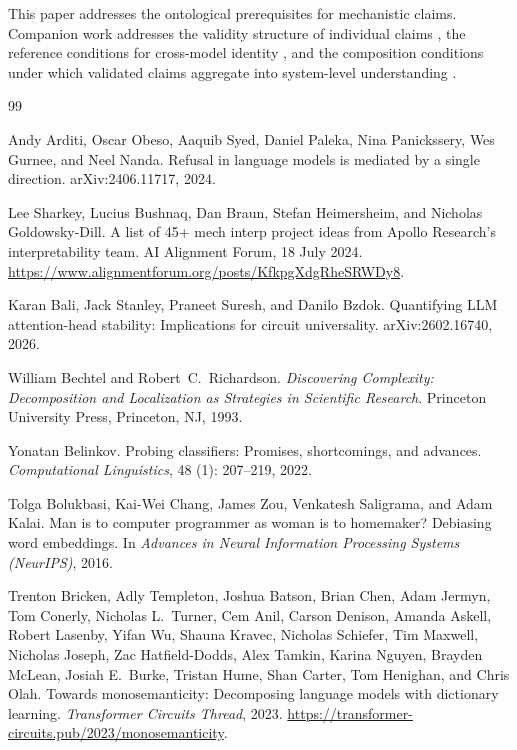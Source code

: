 \documentclass{article}
\begin{document}
This paper addresses the ontological prerequisites for mechanistic
claims.  Companion work addresses the validity structure of individual
claims \citep{tower2026mechvalidity}, the reference conditions for
cross-model identity \citep{tower2026mechreference}, and the composition
conditions under which validated claims aggregate into system-level
understanding \citep{tower2026mechknowledge}.

\begin{thebibliography}{99}

Andy Arditi, Oscar Obeso, Aaquib Syed, Daniel Paleka, Nina Panickssery, Wes Gurnee,
  and Neel Nanda.
\newblock Refusal in language models is mediated by a single direction.
\newblock arXiv:2406.11717, 2024.

Lee Sharkey, Lucius Bushnaq, Dan Braun, Stefan Heimersheim, and Nicholas
  Goldowsky-Dill.
\newblock A list of 45+ mech interp project ideas from {A}pollo {R}esearch's
  interpretability team.
\newblock AI Alignment Forum, 18 July 2024.
  \url{https://www.alignmentforum.org/posts/KfkpgXdgRheSRWDy8}.

Karan Bali, Jack Stanley, Praneet Suresh, and Danilo Bzdok.
\newblock Quantifying {LLM} attention-head stability: Implications for circuit
  universality.
\newblock arXiv:2602.16740, 2026.

William Bechtel and Robert~C.\ Richardson.
\newblock \emph{Discovering Complexity: Decomposition and Localization as
  Strategies in Scientific Research}.
\newblock Princeton University Press, Princeton, NJ, 1993.

Yonatan Belinkov.
\newblock Probing classifiers: Promises, shortcomings, and advances.
\newblock \emph{Computational Linguistics}, 48 (1): 207--219, 2022.

Tolga Bolukbasi, Kai-Wei Chang, James Zou, Venkatesh Saligrama, and Adam Kalai.
\newblock Man is to computer programmer as woman is to homemaker? Debiasing word
  embeddings.
\newblock In \emph{Advances in Neural Information Processing Systems (NeurIPS)}, 2016.

Trenton Bricken, Adly Templeton, Joshua Batson, Brian Chen, Adam Jermyn,
  Tom Conerly, Nicholas L.\ Turner, Cem Anil, Carson Denison, Amanda Askell,
  Robert Lasenby, Yifan Wu, Shauna Kravec, Nicholas Schiefer, Tim Maxwell,
  Nicholas Joseph, Zac Hatfield-Dodds, Alex Tamkin, Karina Nguyen, Brayden
  McLean, Josiah E.\ Burke, Tristan Hume, Shan Carter, Tom Henighan, and
  Chris Olah.
\newblock Towards monosemanticity: Decomposing language models with dictionary
  learning.
\newblock \emph{Transformer Circuits Thread}, 2023.
\newblock \url{https://transformer-circuits.pub/2023/monosemanticity}.


\end{thebibliography}
\end{document}
